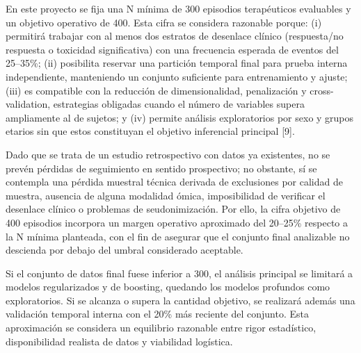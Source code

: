 \documentclass[11pt,a4paper]{article}
\begin{document}
En este proyecto se fija una N mínima de 300 episodios terapéuticos evaluables
y un objetivo operativo de 400. Esta cifra se considera razonable porque: (i)
permitirá trabajar con al menos dos estratos de desenlace clínico
(respuesta/no respuesta o toxicidad significativa) con una frecuencia esperada
de eventos del 25--35\%; (ii) posibilita reservar una partición temporal final
para prueba interna independiente, manteniendo un conjunto suficiente para
entrenamiento y ajuste; (iii) es compatible con la reducción de dimensionalidad,
penalización y cross-validation, estrategias obligadas cuando el número de
variables supera ampliamente al de sujetos; y (iv) permite análisis
exploratorios por sexo y grupos etarios sin que estos constituyan el objetivo
inferencial principal [9].

Dado que se trata de un estudio retrospectivo con datos ya existentes, no se
prevén pérdidas de seguimiento en sentido prospectivo; no obstante, sí se
contempla una pérdida muestral técnica derivada de exclusiones por calidad de
muestra, ausencia de alguna modalidad ómica, imposibilidad de verificar el
desenlace clínico o problemas de seudonimización. Por ello, la cifra objetivo
de 400 episodios incorpora un margen operativo aproximado del 20--25\% respecto
a la N mínima planteada, con el fin de asegurar que el conjunto final analizable
no descienda por debajo del umbral considerado aceptable.

Si el conjunto de datos final fuese inferior a 300, el análisis principal se
limitará a modelos regularizados y de boosting, quedando los modelos profundos
como exploratorios. Si se alcanza o supera la cantidad objetivo, se realizará
además una validación temporal interna con el 20\% más reciente del conjunto.
Esta aproximación se considera un equilibrio razonable entre rigor estadístico,
disponibilidad realista de datos y viabilidad logística.
\end{document}
